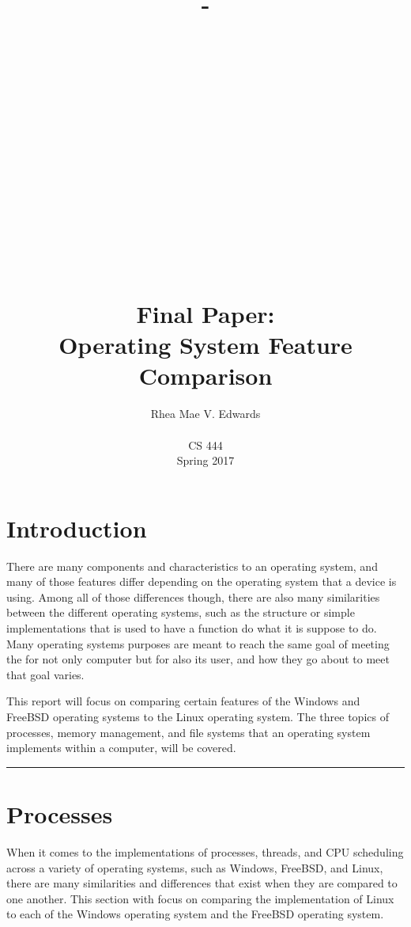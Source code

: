 \documentclass[letterpaper,10pt,onecolumn]{IEEEtran}
\title{-\\ ~ \\ ~ \\ ~ \\ ~ \\ ~ \\ ~ \\ ~ \\ ~ \\ ~ \\ Final Paper: \\Operating System Feature Comparison}
\author{Rhea Mae V. Edwards\\ ~ \\CS 444\\Spring 2017}
\begin{document}
\maketitle
\newpage

\section{\textbf{Introduction}}

\noindent
There are many components and characteristics to an operating system, and many of those features differ depending on the operating system that a device is using. Among all of those differences though, there are also many similarities between the different operating systems, such as the structure or simple implementations that is used to have a function do what it is suppose to do. Many operating systems purposes are meant to reach the same goal of meeting the for not only computer but for also its user, and how they go about to meet that goal varies. 
\par \noindent
This report will focus on comparing certain features of the Windows and FreeBSD operating systems to the Linux operating system. The three topics of processes, memory management, and file systems that an operating system implements within a computer, will be covered.

\noindent\rule{17.8cm}{0.4pt}
\section{\textbf{Processes}}

When it comes to the implementations of processes, threads, and CPU scheduling across a variety of operating systems, such as Windows, FreeBSD, and Linux, there are many similarities and differences that exist when they are compared to one another. This section with focus on comparing the implementation of Linux to each of the Windows operating system and the FreeBSD operating system.
\end{document}
